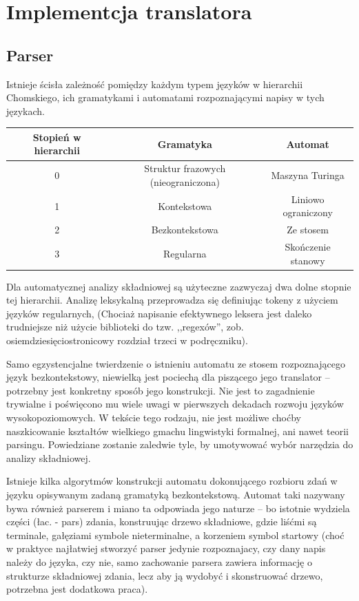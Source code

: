 \chapter{Implementcja translatora}
\section{Parser}
Istnieje ścisła zależność pomiędzy każdym typem języków w hierarchii Chomskiego, ich gramatykami i automatami rozpoznającymi napisy w tych językach.\cite{CHOMSKY1959}\cite{hopcroft_automaty}
\begin{center}
\begin{tabular}{|c|c|c|}
\hline
\textbf{Stopień w hierarchii} & \textbf{Gramatyka} & \textbf{Automat} \\ \hline
0 & Struktur frazowych (nieograniczona) & Maszyna Turinga \\ \hline
1 & Kontekstowa & Liniowo ograniczony\\ \hline
2 & Bezkontekstowa & Ze stosem\\ \hline
3 & Regularna & Skończenie stanowy\\ \hline
\end{tabular}
\end{center}

Dla automatycznej analizy składniowej są użyteczne zazwyczaj dwa dolne stopnie tej hierarchii. Analizę leksykalną przeprowadza się definiując tokeny z użyciem języków regularnych, (Chociaż napisanie efektywnego leksera jest daleko trudniejsze niż użycie biblioteki do tzw. ,,regexów'', zob. osiemdziesięciostronicowy rozdział trzeci w podręczniku\cite{DRAGON_BOOK}).

Samo egzystencjalne twierdzenie o istnieniu automatu ze stosem rozpoznającego język bezkontekstowy, niewielką jest pociechą dla piszącego jego translator – potrzebny jest konkretny sposób jego konstrukcji. Nie jest to zagadnienie trywialne i poświęcono mu wiele uwagi w pierwszych dekadach rozwoju języków wysokopoziomowych. W tekście tego rodzaju, nie jest możliwe choćby naszkicowanie kształtów wielkiego gmachu lingwistyki formalnej, ani nawet teorii parsingu. Powiedziane zostanie zaledwie tyle, by umotywować wybór narzędzia do analizy składniowej.

Istnieje kilka algorytmów konstrukcji automatu dokonującego rozbioru zdań w języku opisywanym zadaną gramatyką bezkontekstową. Automat taki nazywany bywa również parserem i miano ta odpowiada jego naturze – bo istotnie wydziela części (łac. - pars) zdania, konstruując drzewo składniowe, gdzie liśćmi są terminale, gałęziami symbole nieterminalne, a korzeniem symbol startowy (choć w praktyce najłatwiej stworzyć parser jedynie rozpoznajacy, czy dany napis należy do języka, czy nie, samo zachowanie parsera zawiera informację o strukturze składniowej zdania, lecz aby ją wydobyć i skonstruować drzewo, potrzebna jest dodatkowa praca).\cite{DRAGON_BOOK}

